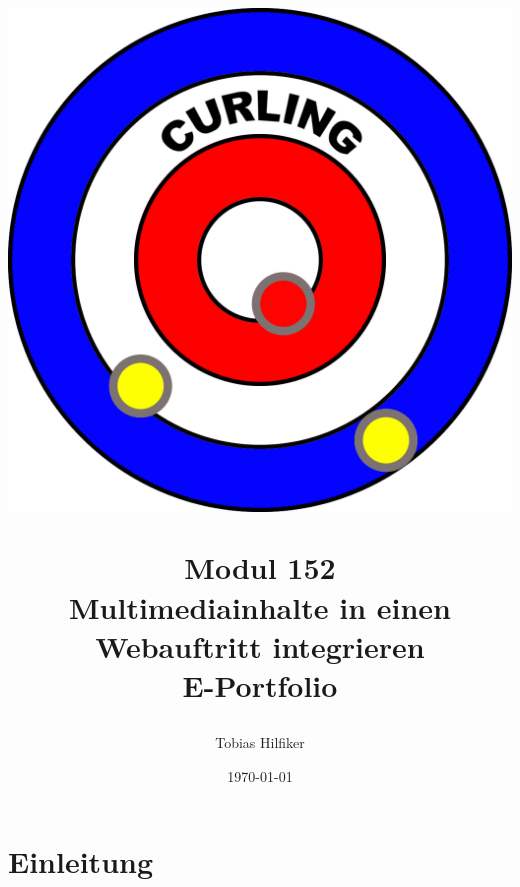 \documentclass[11pt]{article}
\title{
    \includegraphics[width=\textwidth]{media/curling_logo}
    \begin{center}
        Modul 152 \\
        Multimediainhalte in einen Webauftritt integrieren\\
        E-Portfolio
    \end{center}}
\author{Tobias Hilfiker}
\date{\today}
\begin{document}
    \begin{titlingpage}
        \maketitle
    \end{titlingpage}
    \pagebreak

    \tableofcontents
    \pagebreak

    \section{Einleitung}
\end{document}
